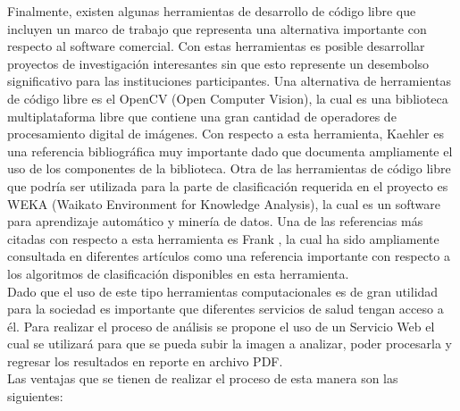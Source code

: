 \documentclass[12pt,letterpaper,titlepage]{article}
\begin{document}
Finalmente, existen algunas herramientas de desarrollo de código libre que incluyen un marco de trabajo que representa una alternativa importante con respecto al software comercial. Con estas herramientas es posible desarrollar proyectos de investigación interesantes sin que esto represente un desembolso significativo para las instituciones participantes. Una alternativa de herramientas de código libre es el OpenCV (Open Computer Vision), la cual es una biblioteca multiplataforma libre que contiene una gran cantidad de operadores de procesamiento digital de imágenes. Con respecto a esta herramienta,  Kaehler \cite{110} es una referencia bibliográfica muy importante dado que documenta ampliamente el uso de los componentes de la biblioteca. Otra de las herramientas de código libre que podría ser utilizada para la parte de clasificación requerida en el proyecto es WEKA (Waikato Environment for Knowledge Analysis), la cual es un software para aprendizaje automático y minería de datos. Una de las referencias más citadas con respecto a esta herramienta es Frank \cite{105}, la cual ha sido ampliamente consultada en diferentes artículos como una referencia importante con respecto a los algoritmos de clasificación disponibles en esta herramienta.\\

Dado que el uso de este tipo herramientas computacionales es de gran utilidad para la sociedad es importante que diferentes servicios de salud tengan acceso a él. Para realizar el proceso de análisis se propone el uso de un Servicio Web el cual se utilizará para que se pueda subir la imagen a analizar, poder procesarla y regresar los resultados en reporte en archivo PDF.\\

Las ventajas que se tienen de realizar el proceso de esta manera son las siguientes:
\end{document}
